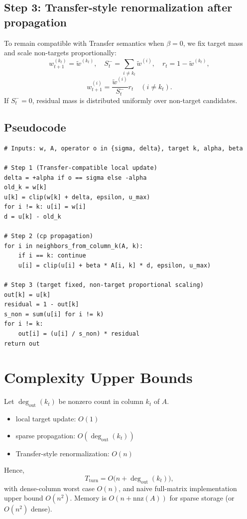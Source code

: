 \documentclass[11pt,a4paper]{article}
\begin{document}
\subsection{Step 3: Transfer-style renormalization after propagation}
To remain compatible with Transfer semantics when \(\beta=0\), we fix target mass and scale non-targets proportionally:
\[
w_{t+1}^{(k_t)}=\tilde{w}^{(k_t)},\quad
S_t^- = \sum_{i\neq k_t} \tilde{w}^{(i)},\quad
r_t=1-\tilde{w}^{(k_t)},
\]
\[
w_{t+1}^{(i)}=\frac{\tilde{w}^{(i)}}{S_t^-}r_t\quad (i\neq k_t).
\]
If \(S_t^-=0\), residual mass is distributed uniformly over non-target candidates.

\subsection{Pseudocode}
\begin{lstlisting}[caption={cp single-turn update with Transfer-compatible normalization}]
# Inputs: w, A, operator o in {sigma, delta}, target k, alpha, beta

# Step 1 (Transfer-compatible local update)
delta = +alpha if o == sigma else -alpha
old_k = w[k]
u[k] = clip(w[k] + delta, epsilon, u_max)
for i != k: u[i] = w[i]
d = u[k] - old_k

# Step 2 (cp propagation)
for i in neighbors_from_column_k(A, k):
    if i == k: continue
    u[i] = clip(u[i] + beta * A[i, k] * d, epsilon, u_max)

# Step 3 (target fixed, non-target proportional scaling)
out[k] = u[k]
residual = 1 - out[k]
s_non = sum(u[i] for i != k)
for i != k:
    out[i] = (u[i] / s_non) * residual
return out
\end{lstlisting}

\section{Complexity Upper Bounds}
Let \(\deg_{\mathrm{out}}(k_t)\) be nonzero count in column \(k_t\) of \(A\).
\begin{itemize}
  \item local target update: \(O(1)\)
  \item sparse propagation: \(O(\deg_{\mathrm{out}}(k_t))\)
  \item Transfer-style renormalization: \(O(n)\)
\end{itemize}
Hence,
\[
T_{\mathrm{turn}} = O\big(n + \deg_{\mathrm{out}}(k_t)\big),
\]
with dense-column worst case \(O(n)\), and naive full-matrix implementation upper bound \(O(n^2)\).
Memory is \(O(n+\mathrm{nnz}(A))\) for sparse storage (or \(O(n^2)\) dense).
\end{document}
